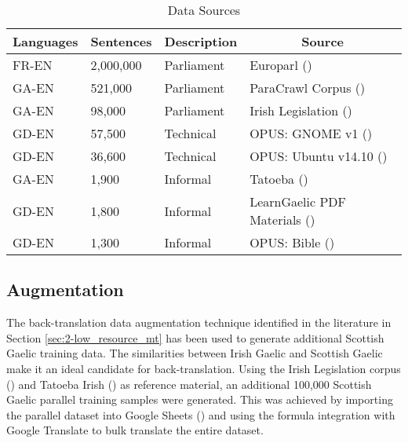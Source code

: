 \begin{table}[!ht]
\centering
\begin{tabular}{|l|l|l|l|}
\hline
\multicolumn{1}{|c|}{\textbf{Languages}} & \multicolumn{1}{c|}{\textbf{Sentences}} & \textbf{Description} & \multicolumn{1}{c|}{\textbf{Source}} \\ \hline
FR-EN   & 2,000,000     & Parliament    & Europarl (\cite{french_corpus_2005}) \\ \hline
GA-EN   & 521,000       & Parliament    & ParaCrawl Corpus (\cite{irish_paracrawl_2020}) \\ \hline
GA-EN   & 98,000        & Parliament    & Irish Legislation (\cite{irish_corpus_2017}) \\ \hline
GD-EN   & 57,500        & Technical     & OPUS: GNOME v1 (\cite{tiedemann_opus_2012}) \\ \hline
GD-EN   & 36,600        & Technical     & OPUS: Ubuntu v14.10 (\cite{tiedemann_opus_2012}) \\ \hline
GA-EN   & 1,900         & Informal      & Tatoeba (\cite{tiedemann_opus_2012}) \\ \hline
GD-EN   & 1,800         & Informal      & LearnGaelic PDF Materials (\cite{learn_gaelic_2019}) \\ \hline
GD-EN   & 1,300         & Informal      & OPUS: Bible (\cite{bible_corpus_2015}) \\ \hline

\end{tabular}
\captionsetup{justification=centering,font=Large}
\caption{\label{tab:available-data} Data Sources}
\end{table}


\subsection{Augmentation}

The back-translation data augmentation technique identified in the literature in Section \ref{sec:2-low_resource_mt} has been used to generate additional Scottish Gaelic training data. The similarities between Irish Gaelic and Scottish Gaelic make it an ideal candidate for back-translation. Using the Irish Legislation corpus (\cite{irish_corpus_2017}) and Tatoeba Irish (\cite{tiedemann_opus_2012}) as reference material, an additional 100,000 Scottish Gaelic parallel training samples were generated. This was achieved by importing the parallel dataset into Google Sheets (\cite{google_sheets_2020}) and using the formula integration with Google Translate to bulk translate the entire dataset.

